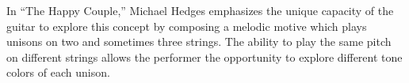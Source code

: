 \documentclass{tufte-handout}
\begin{document}
In ``The Happy Couple,'' Michael Hedges emphasizes the unique capacity of the
guitar to explore this concept by composing a melodic motive which plays
unisons on two and sometimes three strings. The ability to play the same pitch
on different strings allows the performer the opportunity to explore different
tone colors of each unison.

\end{document}
